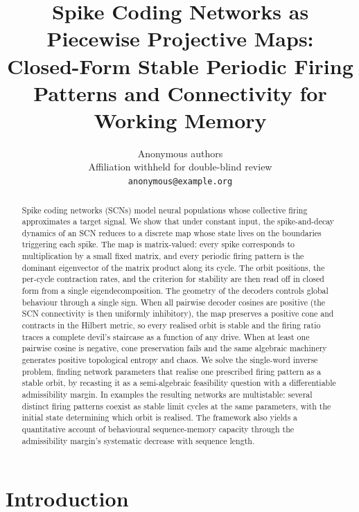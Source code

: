 \documentclass[12pt]{article}
\title{Spike Coding Networks as Piecewise Projective Maps:\\
Closed-Form Stable Periodic Firing Patterns and Connectivity for Working Memory}
\author{Anonymous authors\\
    Affiliation withheld for double-blind review\\
    \texttt{anonymous@example.org}\\
}
\begin{document}
\maketitle

\begin{abstract}
Spike coding networks (SCNs) model neural populations whose collective firing approximates a target signal. We show that under constant input, the spike-and-decay dynamics of an SCN reduces to a discrete map whose state lives on the boundaries triggering each spike. The map is matrix-valued: every spike corresponds to multiplication by a small fixed matrix, and every periodic firing pattern is the dominant eigenvector of the matrix product along its cycle. The orbit positions, the per-cycle contraction rates, and the criterion for stability are then read off in closed form from a single eigendecomposition. The geometry of the decoders controls global behaviour through a single sign. When all pairwise decoder cosines are positive (the SCN connectivity is then uniformly inhibitory), the map preserves a positive cone and contracts in the Hilbert metric, so every realised orbit is stable and the firing ratio traces a complete devil's staircase as a function of any drive. When at least one pairwise cosine is negative, cone preservation fails and the same algebraic machinery generates positive topological entropy and chaos. We solve the single-word inverse problem, finding network parameters that realise one prescribed firing pattern as a stable orbit, by recasting it as a semi-algebraic feasibility question with a differentiable admissibility margin. In examples the resulting networks are multistable: several distinct firing patterns coexist as stable limit cycles at the same parameters, with the initial state determining which orbit is realised. The framework also yields a quantitative account of behavioural sequence-memory capacity through the admissibility margin's systematic decrease with sequence length.
\end{abstract}

\section{Introduction}\label{sec:intro}
\end{document}
